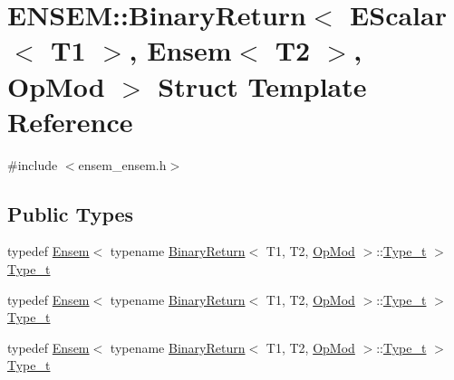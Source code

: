 \hypertarget{structENSEM_1_1BinaryReturn_3_01EScalar_3_01T1_01_4_00_01Ensem_3_01T2_01_4_00_01OpMod_01_4}{}\section{E\+N\+S\+EM\+:\+:Binary\+Return$<$ E\+Scalar$<$ T1 $>$, Ensem$<$ T2 $>$, Op\+Mod $>$ Struct Template Reference}
\label{structENSEM_1_1BinaryReturn_3_01EScalar_3_01T1_01_4_00_01Ensem_3_01T2_01_4_00_01OpMod_01_4}


{\ttfamily \#include $<$ensem\+\_\+ensem.\+h$>$}

\subsection*{Public Types}
\begin{DoxyCompactItemize}
\item 
typedef \mbox{\hyperlink{classENSEM_1_1Ensem}{Ensem}}$<$ typename \mbox{\hyperlink{structENSEM_1_1BinaryReturn}{Binary\+Return}}$<$ T1, T2, \mbox{\hyperlink{structENSEM_1_1OpMod}{Op\+Mod}} $>$\+::\mbox{\hyperlink{structENSEM_1_1BinaryReturn_3_01EScalar_3_01T1_01_4_00_01Ensem_3_01T2_01_4_00_01OpMod_01_4_ac4453d654bf941b42ef12c73739a4b54}{Type\+\_\+t}} $>$ \mbox{\hyperlink{structENSEM_1_1BinaryReturn_3_01EScalar_3_01T1_01_4_00_01Ensem_3_01T2_01_4_00_01OpMod_01_4_ac4453d654bf941b42ef12c73739a4b54}{Type\+\_\+t}}
\item 
typedef \mbox{\hyperlink{classENSEM_1_1Ensem}{Ensem}}$<$ typename \mbox{\hyperlink{structENSEM_1_1BinaryReturn}{Binary\+Return}}$<$ T1, T2, \mbox{\hyperlink{structENSEM_1_1OpMod}{Op\+Mod}} $>$\+::\mbox{\hyperlink{structENSEM_1_1BinaryReturn_3_01EScalar_3_01T1_01_4_00_01Ensem_3_01T2_01_4_00_01OpMod_01_4_ac4453d654bf941b42ef12c73739a4b54}{Type\+\_\+t}} $>$ \mbox{\hyperlink{structENSEM_1_1BinaryReturn_3_01EScalar_3_01T1_01_4_00_01Ensem_3_01T2_01_4_00_01OpMod_01_4_ac4453d654bf941b42ef12c73739a4b54}{Type\+\_\+t}}
\item 
typedef \mbox{\hyperlink{classENSEM_1_1Ensem}{Ensem}}$<$ typename \mbox{\hyperlink{structENSEM_1_1BinaryReturn}{Binary\+Return}}$<$ T1, T2, \mbox{\hyperlink{structENSEM_1_1OpMod}{Op\+Mod}} $>$\+::\mbox{\hyperlink{structENSEM_1_1BinaryReturn_3_01EScalar_3_01T1_01_4_00_01Ensem_3_01T2_01_4_00_01OpMod_01_4_ac4453d654bf941b42ef12c73739a4b54}{Type\+\_\+t}} $>$ \mbox{\hyperlink{structENSEM_1_1BinaryReturn_3_01EScalar_3_01T1_01_4_00_01Ensem_3_01T2_01_4_00_01OpMod_01_4_ac4453d654bf941b42ef12c73739a4b54}{Type\+\_\+t}}
\end{DoxyCompactItemize}


